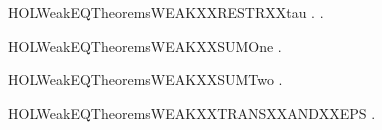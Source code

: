 \newcommand{\HOLWeakEQTheoremsWEAKXXRESTRXXlabel}{\UseVerbatim{HOLWeakEQTheoremsWEAKXXRESTRXXlabel}}
\begin{SaveVerbatim}{HOLWeakEQTheoremsWEAKXXRESTRXXtau}
\HOLTokenTurnstile{} \HOLSymConst{\HOLTokenForall{}} .  \HOLTokenWeakTransBegin\HOLConst{\ensuremath{\tau}}\HOLTokenWeakTransEnd {} \HOLSymConst{\HOLTokenImp{}} \HOLSymConst{\HOLTokenForall{}}.    \HOLTokenWeakTransBegin\HOLConst{\ensuremath{\tau}}\HOLTokenWeakTransEnd {}  
\end{SaveVerbatim}
\newcommand{\HOLWeakEQTheoremsWEAKXXRESTRXXtau}{\UseVerbatim{HOLWeakEQTheoremsWEAKXXRESTRXXtau}}
\begin{SaveVerbatim}{HOLWeakEQTheoremsWEAKXXSUMOne}
\HOLTokenTurnstile{} \HOLSymConst{\HOLTokenForall{}}   .  \HOLTokenWeakTransBegin{}\HOLTokenWeakTransEnd {} \HOLSymConst{\HOLTokenImp{}}  \HOLSymConst{\ensuremath{+}}  \HOLTokenWeakTransBegin{}\HOLTokenWeakTransEnd {}
\end{SaveVerbatim}
\newcommand{\HOLWeakEQTheoremsWEAKXXSUMOne}{\UseVerbatim{HOLWeakEQTheoremsWEAKXXSUMOne}}
\begin{SaveVerbatim}{HOLWeakEQTheoremsWEAKXXSUMTwo}
\HOLTokenTurnstile{} \HOLSymConst{\HOLTokenForall{}}   .  \HOLTokenWeakTransBegin{}\HOLTokenWeakTransEnd {} \HOLSymConst{\HOLTokenImp{}}  \HOLSymConst{\ensuremath{+}}  \HOLTokenWeakTransBegin{}\HOLTokenWeakTransEnd {}
\end{SaveVerbatim}
\newcommand{\HOLWeakEQTheoremsWEAKXXSUMTwo}{\UseVerbatim{HOLWeakEQTheoremsWEAKXXSUMTwo}}
\begin{SaveVerbatim}{HOLWeakEQTheoremsWEAKXXTRANSXXANDXXEPS}
\HOLTokenTurnstile{} \HOLSymConst{\HOLTokenForall{}}   .  \HOLTokenWeakTransBegin{}\HOLTokenWeakTransEnd {} \HOLSymConst{\HOLTokenConj{}}    \HOLSymConst{\HOLTokenImp{}}  \HOLTokenWeakTransBegin{}\HOLTokenWeakTransEnd {}
\end{SaveVerbatim}
